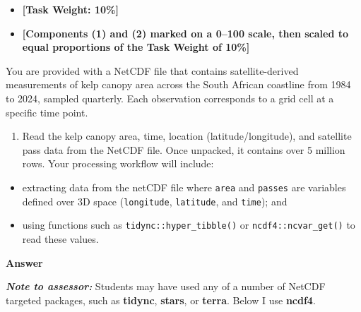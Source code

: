 \documentclass[
  british,
  10pt,
]{article}
\providecommand{\tightlist}{%
  \setlength{\itemsep}{0pt}\setlength{\parskip}{0pt}}
\let\oldtexttt\texttt
\renewcommand{\texttt}[1]{\oldtexttt{\small #1}}
\begin{document}
\begin{itemize}
\tightlist
\item
  \textbf{{[}Task Weight: 10\%{]}}
\item
  \textbf{{[}Components (1) and (2) marked on a 0--100 scale, then
  scaled to equal proportions of the Task Weight of 10\%{]}}
\end{itemize}

You are provided with a NetCDF file that contains satellite-derived
measurements of kelp canopy area across the South African coastline from
1984 to 2024, sampled quarterly. Each observation corresponds to a grid
cell at a specific time point.

\begin{enumerate}
\def\labelenumi{\arabic{enumi}.}
\tightlist
\item
  Read the kelp canopy area, time, location (latitude/longitude), and
  satellite pass data from the NetCDF file. Once unpacked, it contains
  over 5 million rows. Your processing workflow will include:
\end{enumerate}

\begin{itemize}
\tightlist
\item
  extracting data from the netCDF file where \texttt{area} and
  \texttt{passes} are variables defined over 3D space
  (\texttt{longitude}, \texttt{latitude}, and \texttt{time}); and
\item
  using functions such as \texttt{tidync::hyper\_tibble()} or
  \texttt{ncdf4::ncvar\_get()} to read these values.
\end{itemize}

\textbf{Answer}

\textbf{\emph{Note to assessor:}} Students may have used any of a number
of NetCDF targeted packages, such as \textbf{tidync}, \textbf{stars}, or
\textbf{terra}. Below I use \textbf{ncdf4}.
\end{document}
